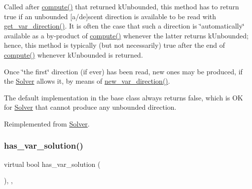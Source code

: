 Called after \mbox{\hyperlink{class_s_m_spp__di__unipi__it_1_1_m_c_f_solver_afc8ff54ab05d22f4cca0fb0bfbeb7a49}{compute()}} that returned k\+Unbounded, this method has to return true if an unbounded \mbox{[}a/de\mbox{]}scent direction is available to be read with \mbox{\hyperlink{class_s_m_spp__di__unipi__it_1_1_m_c_f_solver_af6cbccb8671398cc84c4e0a730a03285}{get\+\_\+var\+\_\+direction()}}. It is often the case that such a direction is \char`\"{}automatically\char`\"{} available as a by-\/product of \mbox{\hyperlink{class_s_m_spp__di__unipi__it_1_1_m_c_f_solver_afc8ff54ab05d22f4cca0fb0bfbeb7a49}{compute()}} whenever the latter returns k\+Unbounded; hence, this method is typically (but not necessarily) true after the end of \mbox{\hyperlink{class_s_m_spp__di__unipi__it_1_1_m_c_f_solver_afc8ff54ab05d22f4cca0fb0bfbeb7a49}{compute()}} whenever k\+Unbounded is returned.

Once \char`\"{}the first\char`\"{} direction (if ever) has been read, new ones may be produced, if the \mbox{\hyperlink{class_s_m_spp__di__unipi__it_1_1_solver}{Solver}} allows it, by means of \mbox{\hyperlink{class_s_m_spp__di__unipi__it_1_1_solver_a673fc1c81a1fc86e55dfab3a37f303bc}{new\+\_\+var\+\_\+direction()}}.

The default implementation in the base class always returns false, which is OK for \mbox{\hyperlink{class_s_m_spp__di__unipi__it_1_1_solver}{Solver}} that cannot produce any unbounded direction. 

Reimplemented from \mbox{\hyperlink{class_s_m_spp__di__unipi__it_1_1_solver_a27e8c876f577289e523ebf26aeeb977a}{Solver}}.

\mbox{\label{class_s_m_spp__di__unipi__it_1_1_m_c_f_solver_ade6d8078e2b6708ea0fa989629de2419}} 
\subsubsection{\texorpdfstring{has\+\_\+var\+\_\+solution()}{has\_var\_solution()}}
{\footnotesize\ttfamily virtual bool has\+\_\+var\+\_\+solution (\begin{DoxyParamCaption}\item[{void}]{ }\end{DoxyParamCaption})\hspace{0.3cm}{\ttfamily [inline]}, {\ttfamily [override]}, {\ttfamily [virtual]}}



